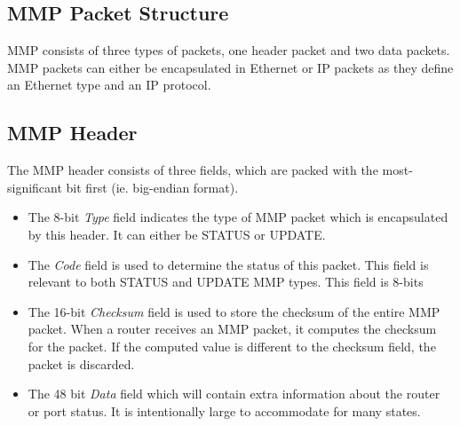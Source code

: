 %
%

\subsection{MMP Packet Structure}

MMP consists of three types of packets, one header packet and two data
packets. MMP packets can either be encapsulated in Ethernet or IP packets as 
they define an Ethernet type and an IP protocol.


\subsection{MMP Header}

The MMP header consists of three fields, which are packed with the
most-significant bit first (ie. big-endian format).

\begin{itemize}
 \item The 8-bit \textit{Type} field indicates the type of MMP packet which is
encapsulated by this header. It can either be STATUS or
UPDATE. 
 \item The \textit{Code} field is used to determine the status of this packet.
This field is relevant to both STATUS and UPDATE MMP types. This field is 8-bits
 \item The 16-bit \textit{Checksum} field is used to store the checksum of the
entire MMP packet. When a router receives an MMP packet, it computes the
checksum for the packet. If the computed value is different to the checksum
field, the packet is discarded.
\item The 48 bit \textit{Data} field which will contain extra information about the router or port status. It is intentionally large to accommodate for many states. 
\end{itemize}


